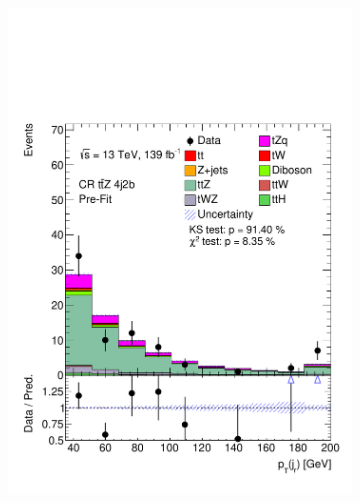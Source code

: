 \begin{figure}[!h]
\begin{subfigure}[b]{0.33\linewidth}
    \includegraphics[width=\linewidth]{ubonn-thesis/Chapters/Chapters_06/Figure/Input_distribution/CR_4j2b_ptjf.pdf} 
  \end{subfigure} 
  \newline
  \vspace*{0.4cm}
  \begin{subfigure}[b]{0.33\linewidth}
    \centering

\end{subfigure}
\end{figure}
